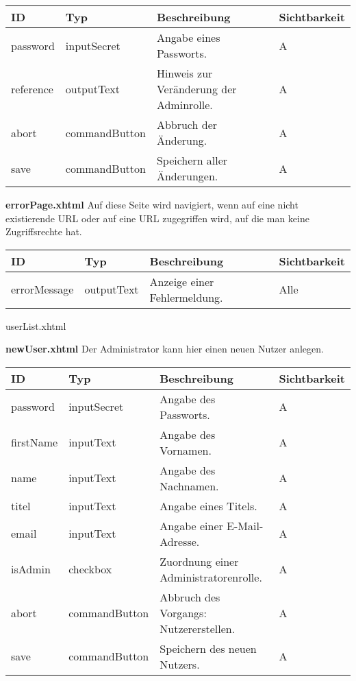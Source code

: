 \begin{tabular}[H]{|m{2cm}|m{3cm}|m{6cm}|m{2.5cm}|}
    \hline
    \textbf{ID} & \textbf{Typ} & \textbf{Beschreibung} & \textbf{Sichtbarkeit} \\
    \hline
    \hline
    password & inputSecret & Angabe eines Passworts. & A\\
    \hline
    reference & outputText & Hinweis zur Veränderung der Adminrolle. & A\\
    \hline
    abort & commandButton & Abbruch der Änderung. & A\\
    \hline
    save & commandButton & Speichern aller Änderungen. & A\\
    \hline
\end{tabular}


\textbf{errorPage.xhtml} Auf diese Seite wird navigiert, wenn auf eine nicht existierende URL oder auf eine URL zugegriffen wird, auf die man keine Zugriffsrechte hat.

\begin{tabular}[H]{|m{2cm}|m{3cm}|m{6cm}|m{2.5cm}|}
    \hline
    \textbf{ID} & \textbf{Typ} & \textbf{Beschreibung} & \textbf{Sichtbarkeit} \\
    \hline
    \hline
    errorMessage & outputText & Anzeige einer Fehlermeldung. & Alle\\
    \hline
\end{tabular}

userList.xhtml

\textbf{newUser.xhtml} Der Administrator kann hier einen neuen Nutzer anlegen.

\begin{tabular}[H]{|m{2cm}|m{3cm}|m{6cm}|m{2.5cm}|}
    \hline
    \textbf{ID} & \textbf{Typ} & \textbf{Beschreibung} & \textbf{Sichtbarkeit} \\
    \hline
    \hline
    password & inputSecret & Angabe des Passworts. & A\\
    \hline
    firstName & inputText & Angabe des Vornamen. & A\\
    \hline
    name & inputText & Angabe des Nachnamen. & A\\
    \hline
    titel & inputText & Angabe eines Titels. & A\\
    \hline
    email & inputText & Angabe einer E-Mail-Adresse. & A\\
    \hline
    isAdmin & checkbox & Zuordnung einer Administratorenrolle. & A\\
    \hline
    abort & commandButton & Abbruch des Vorgangs: Nutzererstellen. & A\\
    \hline
    save & commandButton & Speichern des neuen Nutzers. & A \\
    \hline
\end{tabular}

